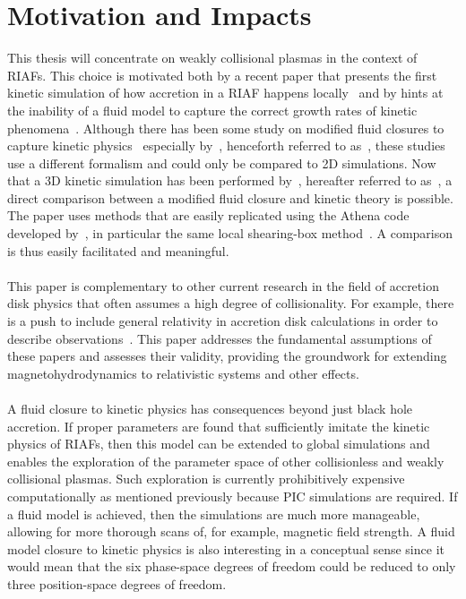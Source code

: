 \section{Motivation and Impacts}
This thesis will concentrate on weakly collisional plasmas in the context of RIAFs. This choice is motivated both by a recent paper that presents the first kinetic simulation of how accretion in a RIAF happens locally~\cite{Kunz2016} and by hints at the inability of a fluid model to capture the correct growth rates of kinetic phenomena~\cite{Sharma2004}. Although there has been some study on modified fluid closures to capture kinetic physics~\cite{Sharma2007,Sharma2003,SharmaThesis} especially by~\citet{Sharma2006}, henceforth referred to as~, these studies use a different formalism and could only be compared to 2D simulations. Now that a 3D kinetic simulation has been performed by~\citet{Kunz2016}, hereafter referred to as~, a direct comparison between a modified fluid closure and kinetic theory is possible. The paper uses methods that are easily replicated using the Athena code developed by~\citet{Stone2008}, in particular the same local shearing-box method~\cite{Stone2010}. A comparison is thus easily facilitated and meaningful. \\
\\
This paper is complementary to other current research in the field of accretion disk physics that often assumes a high degree of collisionality. For example, there is a push to include general relativity in accretion disk calculations in order to describe observations~\cite{Moscibrodzka2014,Ressler2015,Shiokawa2013,Sadowski2016,Niedzwiecki2014,Narayan1998,Gammie2003,Noble2006,Noble2009,Chan2015,Mocibrodzka2009}. This paper addresses the fundamental assumptions of these papers and assesses their validity, providing the groundwork for extending magnetohydrodynamics to relativistic systems and other effects.\\
\\
A fluid closure to kinetic physics has consequences beyond just black hole accretion. If proper parameters are found that sufficiently imitate the kinetic physics of RIAFs, then this model can be extended to global simulations and enables the exploration of the parameter space of other collisionless and weakly collisional plasmas. Such exploration is currently prohibitively expensive computationally as mentioned previously because PIC simulations are required. If a fluid model is achieved, then the simulations are much more manageable, allowing for more thorough scans of, for example, magnetic field strength. A fluid model closure to kinetic physics is also interesting in a conceptual sense since it would mean that the six phase-space degrees of freedom could be reduced to only three position-space degrees of freedom. \\
